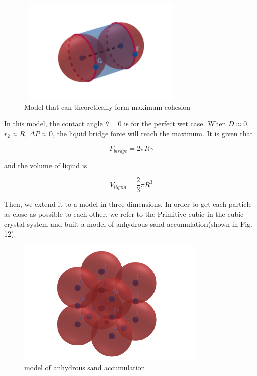 \documentclass[13pt]{ctexart}
\begin{document}
	\begin{figure}[htb]
		\centering %
		\includegraphics[width=8cm,height=5cm]{maxC.png}
		\caption{Model that can theoretically form maximum cohesion}
	\end{figure}
	
	In this model, the contact angle $\theta = 0$ is for the perfect wet case\cite{MuAnalysis}. When $D\approx 0$, $r_{2} \approx R$, $\Delta P \approx 0$, the liquid bridge force will reach the maximum. It is given that
	
	\begin{equation}
	F_{birdge} = 2 \pi R \gamma
	\end{equation}
	
	and the volume of liquid is
	
	\begin{equation}
	V_{liquid} = \frac{2}{3} \pi R^{3}
	\end{equation}
	
	Then, we extend it to a model in three dimensions. In order to get each particle as close as possible to each other, we refer to the Primitive cubic in the cubic crystal system and built a model of anhydrous sand accumulation(shown in Fig. 12).
	
	\begin{figure}[htb]
		\centering %
		\includegraphics[width=9cm,height=6cm]{Cubic.png}
		\caption{model of anhydrous sand accumulation}
	\end{figure}
	
\end{document}
